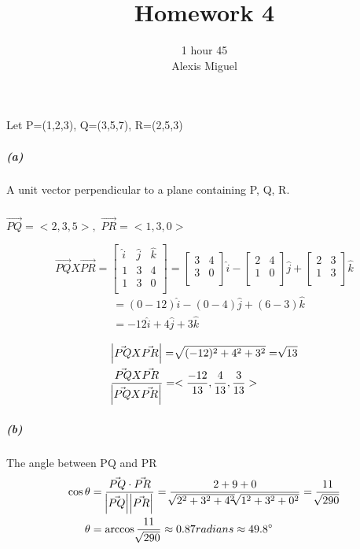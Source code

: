 \documentclass[a4paper]{article}
\title{\vspace{-3cm}Homework 4}
\author{\vspace{-1cm}1 hour 45 \\ Alexis Miguel}
\begin{document}
\maketitle
\section{} 
Let P=(1,2,3),      Q=(3,5,7),      R=(2,5,3)

\subparagraph{(a)}
A unit vector perpendicular to a plane containing P, Q, R. 
\subparagraph{}
$\vec{PQ} = <2,3,5>,$
$\vec{PR} = <1,3,0>$

\[
\vec{PQ}X \vec{PR}=
  \begin{bmatrix}
    \hat{i} & \hat{j} & \hat{k} \\
    1 & 3 & 4 \\
    1 & 3 & 0\\
  \end{bmatrix}
  = \begin{bmatrix}
    3 & 4 \\
    3 & 0 \\
  \end{bmatrix} \hat{i}-
  \begin{bmatrix}
    2 & 4 \\
    1 & 0 \\
  \end{bmatrix} \hat{j}+
  \begin{bmatrix}
    2 & 3 \\
    1 & 3 \\
  \end{bmatrix} \hat{k} 
\]
\begin{equation*}
\begin{split}
& =(0-12)\hat{i}-(0-4)\hat{j}+(6-3)\hat{k} \\
& =-12\hat{i}+4\hat{j}+3\hat{k}\\
\end{split}
\end{equation*}
\begin{equation*}
\begin{split}
&\abs{\vec{PQ}X \vec{PR}}= \sqrt[]{(-12)^2+4^2+3^2}=\sqrt[]{13}\\
&\frac{\vec{PQ}X \vec{PR}}{\abs{\vec{PQ}X \vec{PR}}} = <\frac{-12}{13}, \frac{4}{13},\frac{3}{13} >\\
\end{split}
\end{equation*}
\subparagraph{(b)}
The angle between PQ and PR 
\begin{equation*}
\begin{split}
\cos{\theta} &=  \frac{\vec{PQ}\cdot \vec{PR}}{\abs{\vec{PQ}}\abs{\vec{PR}}}=\frac{2+9+0}{\sqrt[]{2^2+3^2+4^2} \sqrt[]{1^2+3^2+0^2}} =\frac{11}{\sqrt[]{290}}\\
\theta&= \arccos{\frac{11}{\sqrt[]{290}}} \approx0.87 radians \approx49.8 ^{\circ}
\end{split}
\end{equation*}
\end{document}
